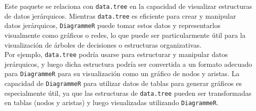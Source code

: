 \documentclass[12pt]{report}\usepackage[]{graphicx}\usepackage[dvipsnames]{xcolor}
\begin{document}
 	Este paquete se relaciona con \texttt{data.tree} en la capacidad de visualizar estructuras de datos jerárquicos. Mientras \texttt{data.tree} es eficiente para crear y manipular datos jerárquicos, \texttt{DiagrammeR} puede tomar estos datos y representarlos visualmente como gráficos o redes, lo que puede ser particularmente útil para la visualización de árboles de decisiones o estructuras organizativas.\\
 	
 	Por ejemplo, \texttt{data.tree} podría usarse para estructurar y manipular datos jerárquicos, y luego dicha estructura podría ser convertida a un formato adecuado para \texttt{DiagrammeR} para su visualización como un gráfico de nodos y aristas. La capacidad de \texttt{DiagrammeR} para utilizar datos de tablas para generar gráficos es especialmente útil, ya que las estructuras de \texttt{data.tree} pueden ser transformadas en tablas (nodos y aristas) y luego visualizadas utilizando \texttt{DiagrammeR}.
 	
\end{document}
